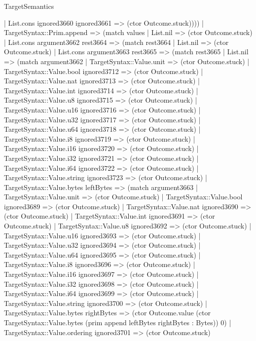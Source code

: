 \begin{lexlean}{TargetSemantics}
\begin{semanticmodule}
{          | List.cons ignored3660 ignored3661 => (ctor Outcome.stuck))))
    | TargetSyntax::Prim.append => (match values
      | List.nil => (ctor Outcome.stuck)
      | List.cons argument3662 rest3664 => (match rest3664
        | List.nil => (ctor Outcome.stuck)
        | List.cons argument3663 rest3665 => (match rest3665
          | List.nil => (match argument3662
            | TargetSyntax::Value.unit => (ctor Outcome.stuck)
            | TargetSyntax::Value.bool ignored3712 => (ctor Outcome.stuck)
            | TargetSyntax::Value.nat ignored3713 => (ctor Outcome.stuck)
            | TargetSyntax::Value.int ignored3714 => (ctor Outcome.stuck)
            | TargetSyntax::Value.u8 ignored3715 => (ctor Outcome.stuck)
            | TargetSyntax::Value.u16 ignored3716 => (ctor Outcome.stuck)
            | TargetSyntax::Value.u32 ignored3717 => (ctor Outcome.stuck)
            | TargetSyntax::Value.u64 ignored3718 => (ctor Outcome.stuck)
            | TargetSyntax::Value.i8 ignored3719 => (ctor Outcome.stuck)
            | TargetSyntax::Value.i16 ignored3720 => (ctor Outcome.stuck)
            | TargetSyntax::Value.i32 ignored3721 => (ctor Outcome.stuck)
            | TargetSyntax::Value.i64 ignored3722 => (ctor Outcome.stuck)
            | TargetSyntax::Value.string ignored3723 => (ctor Outcome.stuck)
            | TargetSyntax::Value.bytes leftBytes => (match argument3663
              | TargetSyntax::Value.unit => (ctor Outcome.stuck)
              | TargetSyntax::Value.bool ignored3689 => (ctor Outcome.stuck)
              | TargetSyntax::Value.nat ignored3690 => (ctor Outcome.stuck)
              | TargetSyntax::Value.int ignored3691 => (ctor Outcome.stuck)
              | TargetSyntax::Value.u8 ignored3692 => (ctor Outcome.stuck)
              | TargetSyntax::Value.u16 ignored3693 => (ctor Outcome.stuck)
              | TargetSyntax::Value.u32 ignored3694 => (ctor Outcome.stuck)
              | TargetSyntax::Value.u64 ignored3695 => (ctor Outcome.stuck)
              | TargetSyntax::Value.i8 ignored3696 => (ctor Outcome.stuck)
              | TargetSyntax::Value.i16 ignored3697 => (ctor Outcome.stuck)
              | TargetSyntax::Value.i32 ignored3698 => (ctor Outcome.stuck)
              | TargetSyntax::Value.i64 ignored3699 => (ctor Outcome.stuck)
              | TargetSyntax::Value.string ignored3700 => (ctor Outcome.stuck)
              | TargetSyntax::Value.bytes rightBytes => (ctor Outcome.value (ctor TargetSyntax::Value.bytes (prim append leftBytes rightBytes : Bytes)) 0)
              | TargetSyntax::Value.ordering ignored3701 => (ctor Outcome.stuck)
}
\end{semanticmodule}
\end{lexlean}
